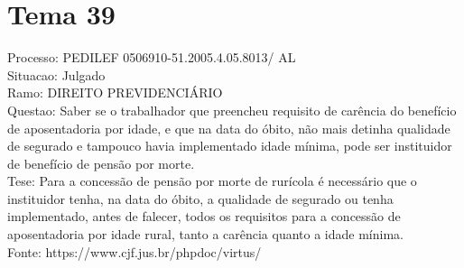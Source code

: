 \documentclass[12pt]{article}
\begin{document}
\section*{Tema 39}
Processo: PEDILEF 0506910-51.2005.4.05.8013/ AL\\
Situacao: Julgado\\
Ramo: DIREITO PREVIDENCIÁRIO\\
Questao: Saber se o trabalhador que preencheu requisito de carência do benefício de aposentadoria por idade, e que na data do óbito, não mais detinha qualidade de segurado e tampouco havia implementado idade mínima, pode ser instituidor de benefício de pensão por morte.\\
Tese: Para a concessão de pensão por morte de rurícola é necessário que o instituidor tenha, na data do óbito, a qualidade de segurado ou tenha implementado, antes de falecer, todos os requisitos para a concessão de aposentadoria por idade rural, tanto a carência quanto a idade mínima.\\
Fonte: https://www.cjf.jus.br/phpdoc/virtus/
\end{document}

